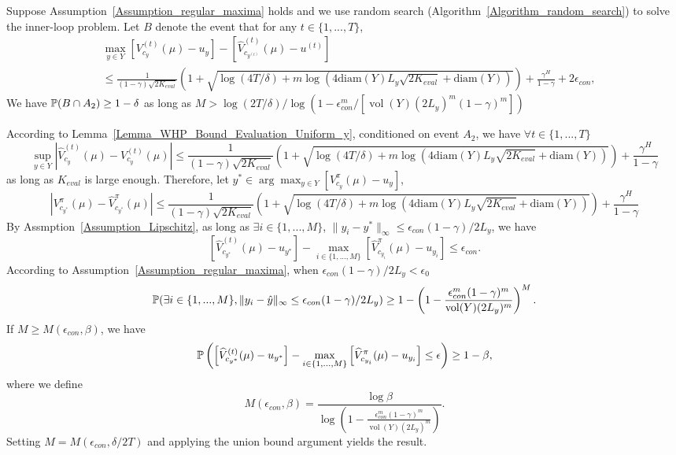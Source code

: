 \begin{lemma}\label{Lemma_constraint_violation_random_search}
    Suppose Assumption~\ref{Assumption_regular_maxima} holds and we use random search (Algorithm~\ref{Algorithm_random_search}) to solve the inner-loop problem.
    Let $B$ denote the event that for any $t\in\{1,...,T\}$, 
    $$\begin{aligned}
    &\max_{y\in Y} \left[V_{c_y}^{(t)}(\mu)-u_y\right]-\left[\widehat V_{c_{y^{(t)}}}^{(t)}(\mu)-u^{(t)}\right]\\
    &\leq \frac{1}{(1-\gamma)\sqrt{2K_{eval}}}\left(1+\sqrt{\log{(4T/\delta)}+m\log(4\mathrm{diam}(Y)L_y\sqrt{2K_{eval}}+\mathrm{diam}(Y))}\right)+\frac{\gamma^H}{1-\gamma}+2\epsilon_{con},
    \end{aligned}$$
    We have ${\mathbb P}(B\cap A_2)\geq 1-\delta$ as long as $M>\log(2T/\delta)/\log(1-\epsilon_{con}^m/[\operatorname{vol}(Y)(2L_y)^m(1-\gamma)^m])    
    $
\end{lemma}
    According to Lemma~\ref{Lemma_WHP_Bound_Evaluation_Uniform_y}, conditioned on event $A_2$, we have $\forall t\in\{1,...,T\}$
     $$
    \sup_{y\in Y}\left|\widehat V_{c_y}^{(t)}(\mu)-V_{c_y}^{(t)}(\mu)\right|\leq \frac{1}{(1-\gamma)\sqrt{2K_{eval}}}\left(1+\sqrt{\log{(4T/\delta)}+m\log(4\mathrm{diam}(Y)L_y\sqrt{2K_{eval}}+\mathrm{diam}(Y))}\right)+\frac{\gamma^H}{1-\gamma}
    $$
    as long as $K_{eval}$ is large enough.
    Therefore, let $y^*\in\arg\max_{y\in Y} \left[V_{c_y}^\pi(\mu)-u_y\right]$, 
    $$
    \left|V_{c_{y^*}}^\pi(\mu)-\widehat{V}_{c_{y^*}}^\pi(\mu)\right|\leq \frac{1}{(1-\gamma)\sqrt{2K_{eval}}}\left(1+\sqrt{\log{(4T/\delta)}+m\log(4\mathrm{diam}(Y)L_y\sqrt{2K_{eval}}+\mathrm{diam}(Y))}\right)+\frac{\gamma^H}{1-\gamma}
    $$
    By Assmption~\ref{Assumption_Lipschitz}, as long as $\exists i\in\{1,...,M\}$, $\|y_i-y^*\|_\infty\leq \epsilon_{con}(1-\gamma)/2L_y$,
    we have 
    $$\left[\widehat V_{c_{y^*}}^{(t)}(\mu)-u_{ y^*}\right]-\max_{i\in\{1,...,M\}}\left[\widehat V_{c_{y_i}}^\pi(\mu)-u_{y_i}\right]\leq \epsilon_{con}.$$
     According to Assumption~\ref{Assumption_regular_maxima}, when $\epsilon_{con}(1-\gamma)/2L_y<\epsilon_0$
    $$
    {\mathbb P}(\exists i\in\{1,...,M\}, \|y_i-\hat y\|_\infty\leq \epsilon_{con}(1-\gamma)/2L_y)\geq 1-\left(1-\frac{\epsilon_{con}^m(1-\gamma)^m}{\operatorname{vol}(Y)(2L_y)^m}\right)^M.
    $$
    If $M\geq M(\epsilon_{con},\beta)$, we have
    $${\mathbb P}\left(\left[\widehat V_{c_{y^*}}^{(t)}(\mu)-u_{ y^*}\right]-\max_{i\in\{1,...,M\}}\left[\widehat V_{c_{y_i}}^\pi(\mu)-u_{y_i}\right]\leq \epsilon\right)\geq 1-\beta,$$ 
    where we define
    $$M(\epsilon_{con},\beta)=\frac{\log\beta}{\log\left(1-\frac{\epsilon_{con}^m(1-\gamma)^m}{\operatorname{vol}(Y)(2L_y)^m}\right)}.
    $$
    Setting $M=M(\epsilon_{con},\delta/2T)$ and applying the union bound argument yields the result.
\endproof

